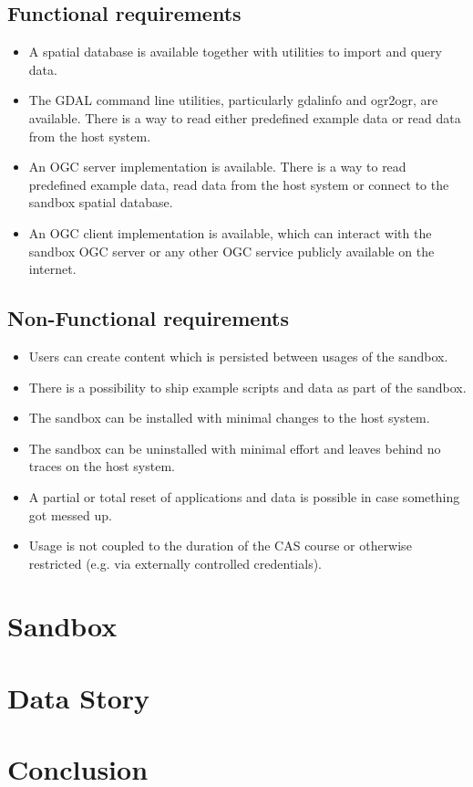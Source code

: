 \documentclass[11pt, a4paper, oneside, parskip=full-]{scrartcl}
\begin{document}
\subsection{Functional requirements}
\begin{itemize}
  \item A spatial database is available together with utilities to import and query data.
  \item The GDAL command line utilities, particularly gdalinfo and ogr2ogr, are available. There is a way to read either
  predefined example data or read data from the host system.
  \item An OGC server implementation is available. There is a way to read predefined example data, read data from the
  host system or connect to the sandbox spatial database.
  \item An OGC client implementation is available, which can interact with the sandbox OGC server or any other OGC
  service publicly available on the internet.
\end{itemize}

\subsection{Non-Functional requirements}
\begin{itemize}
  \item Users can create content which is persisted between usages of the sandbox.
  \item There is a possibility to ship example scripts and data as part of the sandbox.
  \item The sandbox can be installed with minimal changes to the host system.
  \item The sandbox can be uninstalled with minimal effort and leaves behind no traces on the host system.
  \item A partial or total reset of applications and data is possible in case something got messed up.
  \item Usage is not coupled to the duration of the CAS course or otherwise restricted (e.g. via externally controlled credentials).
\end{itemize}

\section{Sandbox}

\section{Data Story}

\section{Conclusion}
\end{document}
